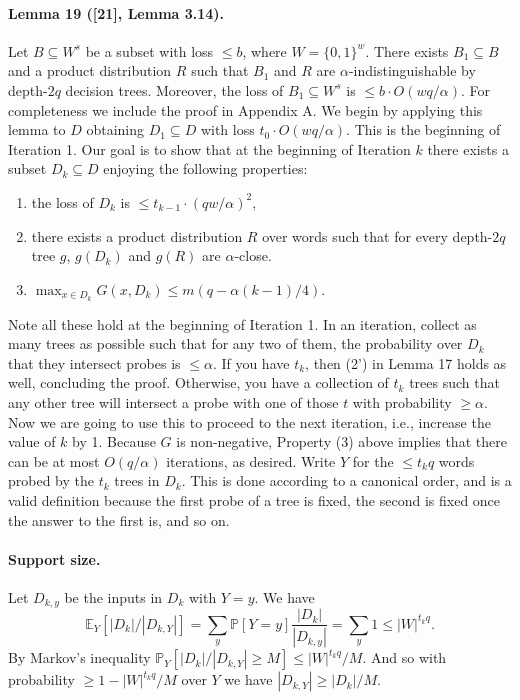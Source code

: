 \paragraph{Lemma 19 ([21], Lemma 3.14).}
Let $B\subseteq W^s$ be a subset with loss $\leq b$, where $W=\{0,1\}^w$. There exists $B_1\subseteq B$ and a product distribution $R$ such that $B_1$ and $R$ are $\alpha$-indistinguishable by depth-$2q$ decision trees. Moreover, the loss of $B_1\subseteq W^s$ is $\leq b\cdot O(wq/\alpha)$.
For completeness we include the proof in Appendix A.
We begin by applying this lemma to $D$ obtaining $D_1\subseteq D$ with loss $t_0\cdot O(wq/\alpha)$. This is the beginning of Iteration 1.
Our goal is to show that at the beginning of Iteration $k$ there exists a subset $D_k\subseteq D$ enjoying the following properties:
\begin{enumerate}
\item[(1)] [in Theorem 16] the loss of $D_k$ is $\leq t_{k-1}\cdot(qw/\alpha)^2$,
\item[(2'')] [in Lemma 17] there exists a product distribution $R$ over words such that for every depth-$2q$ tree $g$, $g(D_k)$ and $g(R)$ are $\alpha$-close.
\item[(3)] $\max_{x\in D_k}G(x,D_k)\leq m(q-\alpha(k-1)/4)$.
\end{enumerate}
Note all these hold at the beginning of Iteration 1.
In an iteration, collect as many trees as possible such that for any two of them, the probability over $D_k$ that they intersect probes is $\leq\alpha$. If you have $t_k$, then (2') in Lemma 17 holds as well, concluding the proof.
Otherwise, you have a collection of $t_k$ trees such that any other tree will intersect a probe with one of those $t$ with probability $\geq\alpha$. Now we are going to use this to proceed to the next iteration, i.e., increase the value of $k$ by 1. Because $G$ is non-negative, Property (3) above implies that there can be at most $O(q/\alpha)$ iterations, as desired.
Write $Y$ for the $\leq t_kq$ words probed by the $t_k$ trees in $D_k$. This is done according to a canonical order, and is a valid definition because the first probe of a tree is fixed, the second is fixed once the answer to the first is, and so on.
\paragraph{Support size.}
Let $D_{k,y}$ be the inputs in $D_k$ with $Y=y$. We have
\[\mathbb E_Y[|D_k|/|D_{k,Y}|]=\sum_y\mathbb P[Y=y]\frac{|D_k|}{|D_{k,y}|}=\sum_y1\leq|W|^{t_kq}.\]
By Markov's inequality $\mathbb P_Y[|D_k|/|D_{k,Y}|\geq M]\leq|W|^{t_kq}/M$. And so with probability $\geq1-|W|^{t_kq}/M$ over $Y$ we have $|D_{k,Y}|\geq|D_k|/M$.
